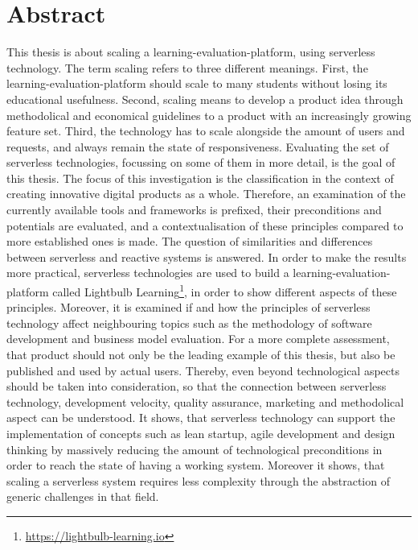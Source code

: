 \chapter*{Abstract}

This thesis is about scaling a learning-evaluation-platform, using serverless technology. The term scaling refers to three different meanings. First, the learning-evaluation-platform should scale to many students without losing its educational usefulness. Second, scaling means to develop a product idea through methodolical and economical guidelines to a product with an increasingly growing feature set. Third, the technology has to scale alongside the amount of users and requests, and always remain the state of responsiveness. Evaluating the set of serverless technologies, focussing on some of them in more detail, is the goal of this thesis. The focus of this investigation is the classification in the context of creating innovative digital products as a whole. Therefore, an examination of the currently available tools and frameworks is prefixed, their preconditions and potentials are evaluated, and a contextualisation of these principles compared to more established ones is made. The question of similarities and differences between serverless and reactive systems is answered. In order to make the results more practical, serverless technologies are used to build a learning-evaluation-platform called Lightbulb Learning\footnote{\url{https://lightbulb-learning.io}}, in order to show different aspects of these principles. Moreover, it is examined if and how the principles of serverless technology affect neighbouring topics such as the methodology of software development and business model evaluation. For a more complete assessment, that product should not only be the leading example of this thesis, but also be published and used by actual users. Thereby, even beyond technological aspects should be taken into consideration, so that the connection between serverless technology, development velocity, quality assurance, marketing and methodolical aspect can be understood. It shows, that serverless technology can support the implementation of concepts such as lean startup, agile development and design thinking by massively reducing the amount of technological preconditions in order to reach the state of having a working system. Moreover it shows, that scaling a serverless system requires less complexity through the abstraction of generic challenges in that field.